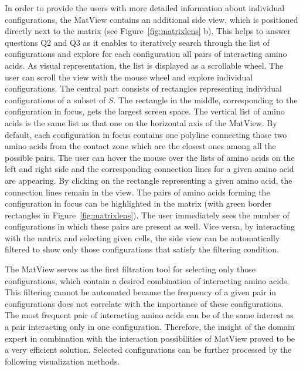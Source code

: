 \documentclass{bmcart}
\begin{document}
In order to provide the users with more detailed information about individual configurations, the MatView contains an additional side view, which is positioned directly next to the matrix (see Figure~\ref{fig:matrixlens} b).
This helps to answer questions Q2 and Q3 as it enables to iteratively search through the list of configurations and explore for each configuration all pairs of interacting amino acids.
As visual representation, the list is displayed as a scrollable wheel.
The user can scroll the view with the mouse wheel and explore individual configurations.
The central part consists of rectangles representing individual configurations of a subset of $S$.
The rectangle in the middle, corresponding to the configuration in focus, gets the largest screen space.
The vertical list of amino acids is the same list as that one on the horizontal axis of the MatView.
By default, each configuration in focus contains one polyline connecting those two amino acids from the contact zone which are the closest ones among all the possible pairs.
The user can hover the mouse over the lists of amino acids on the left and right side and the corresponding connection lines for a given amino acid are appearing.
By clicking on the rectangle representing a given amino acid, the connection lines remain in the view. 
The pairs of amino acids forming the configuration in focus can be highlighted in the matrix (with green border rectangles in Figure~\ref{fig:matrixlens}).
The user immediately sees the number of configurations in which these pairs are present as well.
Vice versa, by interacting with the matrix and selecting given cells, the side view can be automatically filtered to show only those configurations that satisfy the filtering condition.

The MatView serves as the first filtration tool for selecting only those configurations, which contain a desired combination of interacting amino acids.
This filtering cannot be automated because the frequency of a given pair in configurations does not correlate with the importance of these configurations.
The most frequent pair of interacting amino acids can be of the same interest as a pair interacting only in one configuration.
Therefore, the insight of the domain expert in combination with the interaction possibilities of MatView proved to be a very efficient solution.
Selected configurations can be further processed by the following visualization methods.

\end{document}
